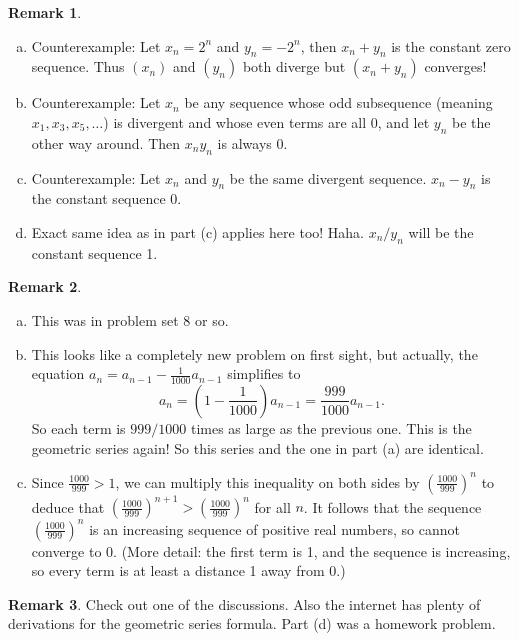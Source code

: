 \documentclass[11pt,oneside]{amsart}
\theoremstyle{definition}
\newtheorem{remark}{Remark}
\begin{document}
\begin{remark}
  \leavevmode\begin{enumerate}[(a)]
    \item Counterexample: Let $x_n=2^n$ and $y_n=-2^n$, then $x_n+y_n$ is the constant zero sequence. Thus $(x_n)$ and $(y_n)$ both diverge but $(x_n+y_n)$ converges!
    \item Counterexample: Let $x_n$ be any sequence whose odd subsequence (meaning $x_1,x_3,x_5,\dots$) is divergent and whose even terms are all 0, and let $y_n$ be the other way around. Then $x_ny_n$ is always 0.
    \item Counterexample: Let $x_n$ and $y_n$ be the same divergent sequence. $x_n-y_n$ is the constant sequence 0.
    \item Exact same idea as in part (c) applies here too! Haha. $x_n/y_n$ will be the constant sequence 1.
  \end{enumerate}
\end{remark}

\begin{remark}
  \leavevmode\begin{enumerate}[(a)]
    \item This was in problem set 8 or so.
    \item This looks like a completely new problem on first sight, but actually, the equation $a_n=a_{n-1}-\frac 1{1000}a_{n-1}$ simplifies to
    \[a_n=\left( 1-\frac 1{1000} \right)a_{n-1}=\frac{999}{1000}a_{n-1}.\]
    So each term is $999/1000$ times as large as the previous one. This is the geometric series again! So this series and the one in part (a) are identical.
    \item Since $\frac{1000}{999}>1$, we can multiply this inequality on both sides by $\left( \frac{1000}{999} \right)^n$ to deduce that $\left(\frac{1000}{999}\right)^{n+1}>\left(\frac{1000}{999}\right)^n$ for all $n$. It follows that the sequence $\left( \frac{1000}{999} \right)^n$ is an increasing sequence of positive real numbers, so cannot converge to 0. (More detail: the first term is 1, and the sequence is increasing, so every term is at least a distance 1 away from 0.)
  \end{enumerate}
\end{remark}

\begin{remark}
  Check out one of the discussions. Also the internet has plenty of derivations for the geometric series formula. Part (d) was a homework problem.
\end{remark}
\end{document}
